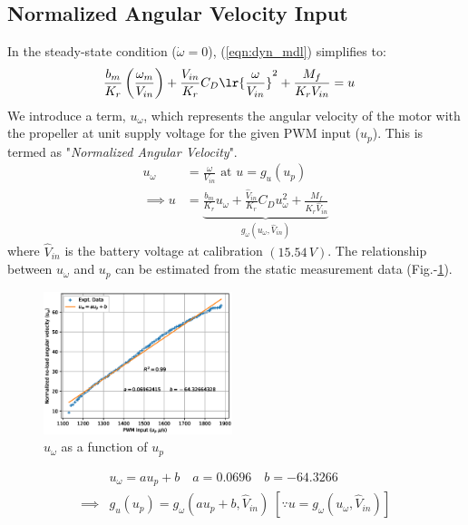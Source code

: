 \subsection{Normalized Angular Velocity Input}
In the steady-state condition ($\dot \omega = 0$), (\ref{eqn:dyn_mdl}) simplifies to:
\begin{align}
    &\frac{b_m}{K_r} \left(\frac{\omega_m}{V_{in}}\right) + \frac{V_{in}}{K_r} C_D \lr{\frac{\omega}{V_{in}}}^2 + \frac{M_f}{K_r V_{in}} = u
\end{align}
We introduce a term, $u_{\omega}$, which represents the angular velocity of the motor with the propeller at unit supply voltage for the given PWM input ($u_p$). This is termed as "\textit{Normalized Angular Velocity}".
\begin{align}
    u_{\omega} &= \frac{\omega}{V_{in}} \text{  at  } u = g_u(u_p) \\
    \implies u &= \underbrace{\frac{b_m}{K_r} u_\omega + \frac{\hat V_{in}}{K_r} C_D u_\omega^2 + \frac{M_f}{K_r  \hat V_{in}}}_{g_\omega (u_\omega, \hat V_{in})}
     \label{eqn::input_def}
\end{align}
where $\hat V_{in}$ is the battery voltage at calibration $(15.54\,V)$.
The relationship between $u_\omega$ and $u_p$ can be estimated from the static
measurement data (Fig.-\ref{fig::norm_omega}).
\begin{figure}[H]
    \centering
    \includegraphics[width = 0.49\textwidth]{Part2/figs/3_figs/norm_omega/no-load_rpm.eps}
    \caption{$u_\omega$ as a function of $u_p$}
    \label{fig::norm_omega}
\end{figure}
\begin{align}
    &u_\omega = a u_p + b
    \quad a = 0.0696
    \quad b = -64.3266\\
    \implies& g_u(u_p) = g_\omega(a u_p  + b, \hat V_{in})
    \; [\because u = g_\omega(u_\omega, \hat V_{in})]
\end{align}
